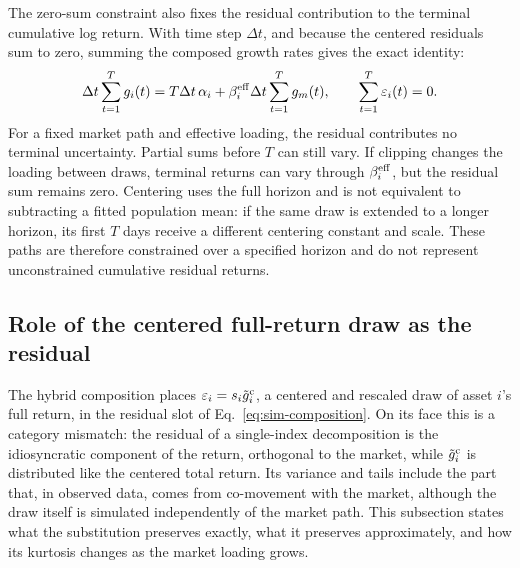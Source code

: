 The zero-sum constraint also fixes the residual contribution to the
terminal cumulative log return. With time step $\Delta t$, and because
the centered residuals sum to zero, summing the composed growth rates
gives the exact identity:
\begin{equation}
  \Delta t\sum_{t=1}^{T} g_i(t)
  = T\Delta t\,\alpha_i
    + \beta_i^{\mathrm{eff}}\Delta t\sum_{t=1}^{T}g_m(t),
  \qquad \sum_{t=1}^{T}\varepsilon_i(t)=0.
  \label{eq:supp-zero-sum-terminal}
\end{equation}
For a fixed market path and effective loading, the residual contributes
no terminal uncertainty. Partial sums before $T$ can still vary. If
clipping changes the loading between draws, terminal returns can vary
through $\beta_i^{\mathrm{eff}}$, but the residual sum remains zero. Centering
uses the full horizon and is not equivalent to subtracting a fitted
population mean: if the same draw is extended to a longer horizon, its
first $T$ days receive a different centering constant and scale. These
paths are therefore constrained over a specified horizon and do not
represent unconstrained cumulative residual returns.

\subsection{Role of the centered full-return draw as the residual}
\label{sec:supp-residual-choice}

The hybrid composition places $\varepsilon_i = s_i \tilde{g}_i^{\mathrm c}$, a
centered and rescaled draw of asset $i$'s full return, in the residual
slot of Eq.~\eqref{eq:sim-composition}. On its face this is a category
mismatch: the residual of a single-index decomposition is the
idiosyncratic component of the return, orthogonal to the market, while
$\tilde{g}_i^{\mathrm c}$ is distributed like the centered total return. Its
variance and tails include the part that, in observed data, comes
from co-movement with the market, although the draw itself is
simulated independently of the market path. This subsection states
what the substitution preserves exactly, what it preserves
approximately, and how its kurtosis changes as the market loading
grows.

